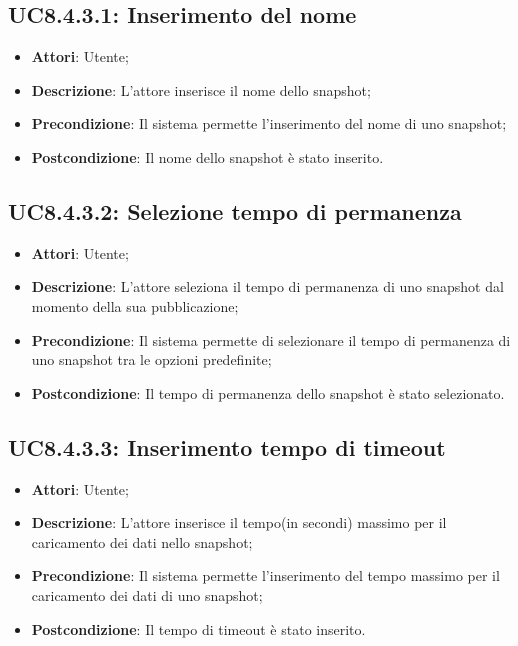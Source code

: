 \subsection{UC8.4.3.1: Inserimento del nome}
\begin{itemize}
	\item \textbf{Attori}: Utente;
	\item \textbf{Descrizione}: L'attore inserisce il nome dello snapshot;
	\item \textbf{Precondizione}: Il sistema permette l'inserimento del nome di uno snapshot;
	\item \textbf{Postcondizione}: Il nome dello snapshot è stato inserito.
\end{itemize}

\subsection{UC8.4.3.2: Selezione tempo di permanenza}
\begin{itemize}
	\item \textbf{Attori}: Utente;
	\item \textbf{Descrizione}: L'attore seleziona il tempo di permanenza di uno snapshot dal momento della sua pubblicazione;
	\item \textbf{Precondizione}: Il sistema permette di selezionare il tempo di permanenza di uno snapshot tra le opzioni predefinite;
	\item \textbf{Postcondizione}: Il tempo di permanenza dello snapshot è stato selezionato.
\end{itemize}

\subsection{UC8.4.3.3: Inserimento tempo di timeout}
\begin{itemize}
	\item \textbf{Attori}: Utente;
	\item \textbf{Descrizione}: L'attore inserisce il tempo(in secondi) massimo per il caricamento dei dati nello snapshot;
	\item \textbf{Precondizione}: Il sistema permette l'inserimento del tempo massimo per il caricamento dei dati di uno snapshot;
	\item \textbf{Postcondizione}: Il tempo di timeout è stato inserito.
\end{itemize}





